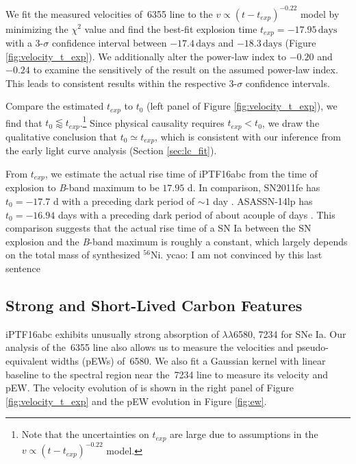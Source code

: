 \documentclass[twocolumn]{aastex61}
\newcommand{\ycao}[1]{{\color{red} ycao: {#1}}}
\begin{document}
We fit the measured velocities of \,6355 line to the
$v\propto(t-t_{exp})^{-0.22}$ model by minimizing the $\chi^2$ value
and find the best-fit explosion time $t_{exp}=-17.95\,\textrm{days}$
with a 3-$\sigma$ confidence interval between $-17.4\,\textrm{days}$
and $-18.3\,\textrm{days}$ (Figure \ref{fig:velocity_t_exp}). We additionally
alter the power-law index to $-0.20$ and $-0.24$ to examine the
sensitively of the result on the assumed power-law index.  This 
leads to consistent results within the respective 3-$\sigma$ 
confidence intervals.

Compare the estimated $t_{exp}$ to $t_0$ (left panel of Figure
\ref{fig:velocity_t_exp}), we find that $t_0\lessapprox t_{exp}$.\footnote{Note that the uncertainties on $t_{exp}$ are large due to assumptions in the $v\propto(t-t_{exp})^{-0.22}$ model.}
Since physical causality requires $t_{exp}<t_0$, we draw the qualitative
conclusion that $t_0\simeq t_{exp}$, which is consistent
with our inference from the early light curve analysis (Section
\ref{sec:lc_fit}).

From $t_{exp}$, we estimate the actual rise time of iPTF16abc from the
time of explosion to \textit{B}-band maximum to be $17.95$ d.  In
comparison, SN2011fe has $t_0=-17.7$ d \citep{2013A&A...554A..27P}
with a preceding dark period of $\sim 1$ day
\citep{2014ApJ...784...85P}. ASASSN-14lp has $t_0=-16.94$ days with a
preceding dark period of about acouple of days
\citep{2016ApJ...826..144S}. This comparison suggests that the actual
rise time of a SN Ia between the SN explosion and the \textit{B}-band
maximum is roughly a constant, which largely depends on the total mass
of synthesized $^{56}$Ni.\ycao{I am not convinced by this last sentence}

\subsection{Strong and Short-Lived Carbon Features}
\label{sec:carbon}

iPTF16abc exhibits unusually strong absorption of
 $\lambda\lambda$6580, 7234 for SNe Ia. Our analysis of the
\,6355 line also allows us to measure the velocities and
pseudo-equivalent widths (pEWs) of \,6580. We also fit a Gaussian
kernel with linear baseline to the spectral region near
the \,7234 line to measure its velocity and pEW. 
The velocity evolution of  is shown in the right panel
of Figure \ref{fig:velocity_t_exp} and the pEW evolution
in Figure \ref{fig:ew}. 
\end{document}
